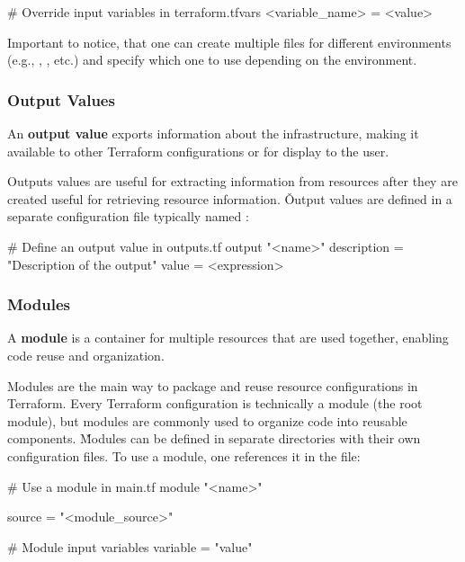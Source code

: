 \begin{block}
# Override input variables in terraform.tfvars
<variable_name> = <value>
\end{block}

Important to notice, that one can create multiple  files for different environments (e.g.,
, , etc.) and specify which one to use depending on the environment.

\subsubsection{Output Values}

An \textbf{output value} exports information about the infrastructure, making it available to other Terraform
configurations or for display to the user.
\ed

Outputs values are useful for extracting information from resources after they are created useful for retrieving
resource information. \v

Output values are defined in a separate configuration file typically named :

\begin{block}
# Define an output value in outputs.tf
output "<name>" {
    description = "Description of the output"
    value = <expression>
}
\end{block}

\subsubsection{Modules}

\bd[Module]
A \textbf{module} is a container for multiple resources that are used together, enabling code reuse and organization.
\ed

Modules are the main way to package and reuse resource configurations in Terraform. Every Terraform configuration is
technically a module (the root module), but modules are commonly used to organize code into reusable components. \v

Modules can be defined in separate directories with their own configuration files. To use a module, one references
it in the  file:

\begin{block}
# Use a module in main.tf
module "<name>" {
    source = "<module_source>"

    # Module input variables
    variable = "value"
}
\end{block}

